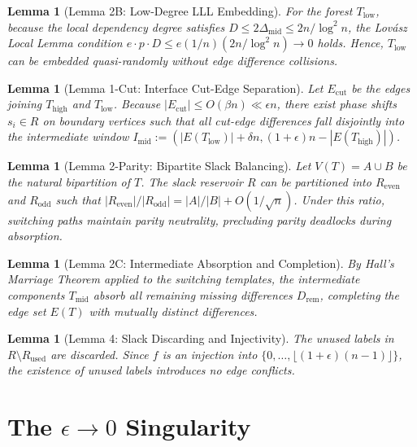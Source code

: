 \documentclass[11pt,a4paper]{article}
\newtheorem{lemma}[theorem]{Lemma}
\begin{document}
\begin{lemma}[Lemma 2B: Low-Degree LLL Embedding]\label{lem:2b}
For the forest $T_{\text{low}}$, because the local dependency degree satisfies $D \le 2\Delta_{\text{mid}} \le 2n/\log^2 n$, the Lov\'asz Local Lemma condition $e \cdot p \cdot D \le e (1/n)(2n/\log^2 n) \to 0$ holds. Hence, $T_{\text{low}}$ can be embedded quasi-randomly without edge difference collisions.
\end{lemma}

\begin{lemma}[Lemma 1-Cut: Interface Cut-Edge Separation]\label{lem:cut}
Let $E_{\text{cut}}$ be the edges joining $T_{\text{high}}$ and $T_{\text{low}}$. Because $|E_{\text{cut}}| \le O(\beta n) \ll \epsilon n$, there exist phase shifts $s_i \in R$ on boundary vertices such that all cut-edge differences fall disjointly into the intermediate window $I_{\text{mid}} := (|E(T_{\text{low}})|+\delta n, (1+\epsilon)n - |E(T_{\text{high}})|)$.
\end{lemma}

\begin{lemma}[Lemma 2-Parity: Bipartite Slack Balancing]\label{lem:parity}
Let $V(T) = A \cup B$ be the natural bipartition of $T$. The slack reservoir $R$ can be partitioned into $R_{\text{even}}$ and $R_{\text{odd}}$ such that $|R_{\text{even}}|/|R_{\text{odd}}| = |A|/|B| + O(1/\sqrt{n})$. Under this ratio, switching paths maintain parity neutrality, precluding parity deadlocks during absorption.
\end{lemma}

\begin{lemma}[Lemma 2C: Intermediate Absorption and Completion]\label{lem:2c}
By Hall's Marriage Theorem applied to the switching templates, the intermediate components $T_{\text{mid}}$ absorb all remaining missing differences $D_{\text{rem}}$, completing the edge set $E(T)$ with mutually distinct differences.
\end{lemma}

\begin{lemma}[Lemma 4: Slack Discarding and Injectivity]\label{lem:4}
The unused labels in $R \setminus R_{\text{used}}$ are discarded. Since $f$ is an injection into $\{0, \dots, \lfloor(1+\epsilon)(n-1)\rfloor\}$, the existence of unused labels introduces no edge conflicts.
\end{lemma}

\section{The $\epsilon \to 0$ Singularity}
\end{document}
